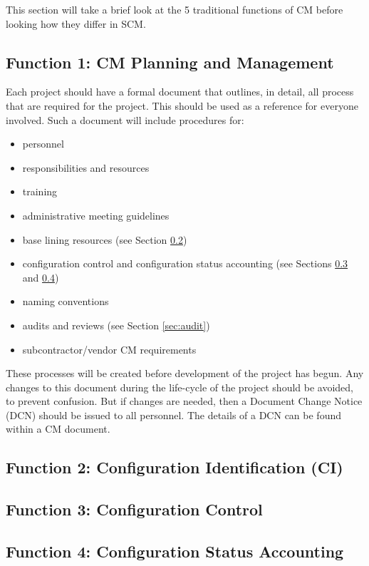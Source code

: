 \documentclass[cmpstyle]{ueacmpstyle}
\begin{document}
	This section will take a brief look at the 5 traditional functions of CM before looking how they differ in SCM. 
	
		\subsection{Function 1: CM Planning and Management} \label{sec:planning}
		Each project should have a formal document that outlines, in detail, all process that are required for the project. This should be used as a reference for everyone involved. Such a document will include procedures for:
		\begin{itemize}
			\item personnel
			\item responsibilities and resources
			\item training
			\item administrative meeting guidelines
			\item base lining resources (see Section \ref{sec:identify})
			\item configuration control and configuration status accounting (see Sections \ref{sec:control} and \ref{sec:accounting})
			\item naming conventions
			\item audits and reviews (see Section \ref{sec:audit})
			\item subcontractor/vendor CM requirements
		\end{itemize}
		These processes will be created before development of the project has begun. Any changes to this document during the life-cycle of the project should be avoided, to prevent confusion. But if changes are needed, then a Document Change Notice (DCN) should be issued to all personnel. The details of a DCN can be found within a CM document.
		
		\subsection{Function 2: Configuration Identification (CI)} \label{sec:identify}
		
		
		\subsection{Function 3: Configuration Control} \label{sec:control}
		
		\subsection{Function 4: Configuration Status Accounting} \label{sec:accounting}
		
\end{document}
